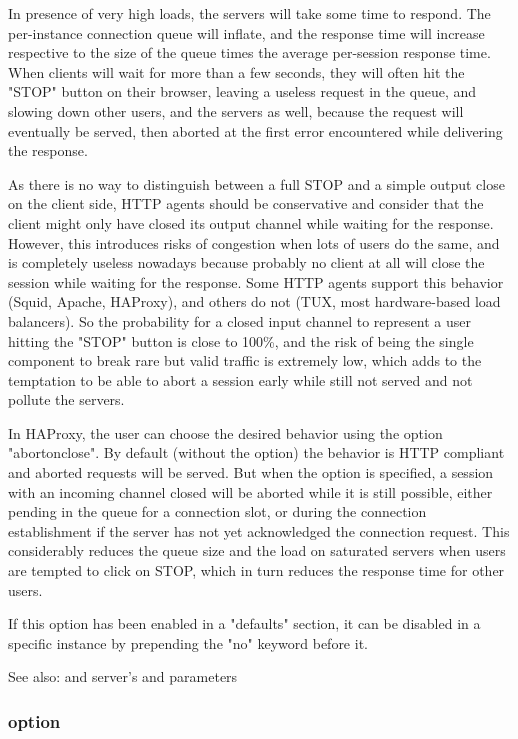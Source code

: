   In presence of very high loads, the servers will take some time to respond.
  The per-instance connection queue will inflate, and the response time will
  increase respective to the size of the queue times the average per-session
  response time. When clients will wait for more than a few seconds, they will
  often hit the "STOP" button on their browser, leaving a useless request in
  the queue, and slowing down other users, and the servers as well, because the
  request will eventually be served, then aborted at the first error
  encountered while delivering the response.

  As there is no way to distinguish between a full STOP and a simple output
  close on the client side, HTTP agents should be conservative and consider
  that the client might only have closed its output channel while waiting for
  the response. However, this introduces risks of congestion when lots of users
  do the same, and is completely useless nowadays because probably no client at
  all will close the session while waiting for the response. Some HTTP agents
  support this behavior (Squid, Apache, HAProxy), and others do not (TUX, most
  hardware-based load balancers). So the probability for a closed input channel
  to represent a user hitting the "STOP" button is close to 100\%, and the risk
  of being the single component to break rare but valid traffic is extremely
  low, which adds to the temptation to be able to abort a session early while
  still not served and not pollute the servers.

  In HAProxy, the user can choose the desired behavior using the option
  "abortonclose". By default (without the option) the behavior is HTTP
  compliant and aborted requests will be served. But when the option is
  specified, a session with an incoming channel closed will be aborted while
  it is still possible, either pending in the queue for a connection slot, or
  during the connection establishment if the server has not yet acknowledged
  the connection request. This considerably reduces the queue size and the load
  on saturated servers when users are tempted to click on STOP, which in turn
  reduces the response time for other users.

  If this option has been enabled in a "defaults" section, it can be disabled
  in a specific instance by prepending the "no" keyword before it.

  See also:  and server's  and  parameters

\subsubsection[accept-invalid-http-request]{option }
